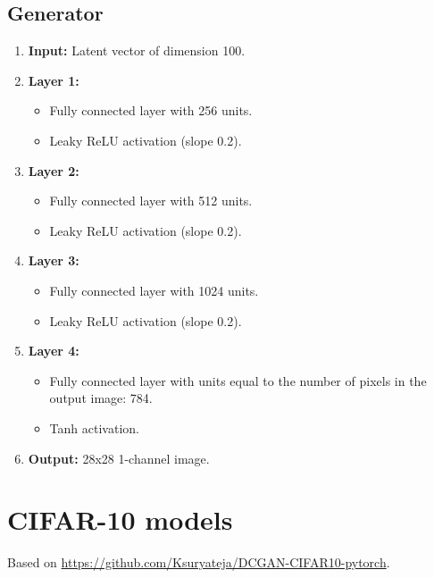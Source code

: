 \subsection*{Generator}
\begin{enumerate}
    \item \textbf{Input:} Latent vector of dimension 100.
    \item \textbf{Layer 1:} 
    \begin{itemize}
        \item Fully connected layer with 256 units.
        \item Leaky ReLU activation (slope 0.2).
    \end{itemize}
    \item \textbf{Layer 2:} 
    \begin{itemize}
        \item Fully connected layer with 512 units.
        \item Leaky ReLU activation (slope 0.2).
    \end{itemize}
    \item \textbf{Layer 3:} 
    \begin{itemize}
        \item Fully connected layer with 1024 units.
        \item Leaky ReLU activation (slope 0.2).
    \end{itemize}
    \item \textbf{Layer 4:} 
    \begin{itemize}
        \item Fully connected layer with units equal to the number of pixels in the output image: 784.
        \item Tanh activation.
    \end{itemize}
    \item \textbf{Output:} 28x28 1-channel image.
\end{enumerate}

\section{CIFAR-10 models}
Based on \url{https://github.com/Ksuryateja/DCGAN-CIFAR10-pytorch}.
